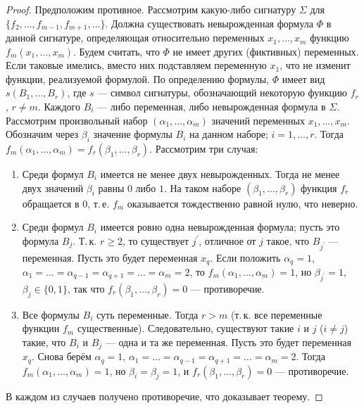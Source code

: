\begin{proof}
    Предположим противное. Рассмотрим какую-либо сигнатуру $\Sigma$ для $\{f_2, \ldots, f_{m - 1}, f_{m + 1}, \ldots\}$. Должна существовать невырожденная формула $\Phi$ в данной сигнатуре, определяющая относительно переменных $x_1, \ldots, x_m$ функцию $f_m(x_1, \ldots, x_m)$. Будем считать, что $\Phi$ не имеет других (фиктивных) переменных. Если таковые имелись, вместо них подставляем переменную $x_1$, что не изменит функции, реализуемой формулой. По определению формулы, $\Phi$ имеет вид $s(B_1, \ldots, B_r)$, где $s$ --- символ сигнатуры, обозначающий некоторую функцию $f_r$, $r \ne m$. Каждого $B_i$ --- либо переменная, либо невырожденная формула в $\Sigma$. Рассмотрим произвольный набор $(\alpha_1, \ldots, \alpha_m)$ значений переменных $x_1, \ldots, x_m$. Обозначим через $\beta_i$ значение формулы $B_i$ на данном наборе; $i = 1, \ldots, r$. Тогда $f_m(\alpha_1, \ldots, \alpha_m) = f_r(\beta_1, \ldots, \beta_r)$. Рассмотрим три случая:
    \begin{enumerate}
        \item Среди формул $B_i$ имеется не менее двух невырожденных. Тогда не менее двух значений $\beta_i$ равны $0$ либо $1$. На таком наборе $(\beta_1, \ldots, \beta_r)$ функция $f_r$ обращается в $0$, т.\,е. $f_m$ оказывается тождественно равной нулю, что неверно.
        \item Среди формул $B_i$ имеется ровно одна невырожденная формула; пусть это формула $B_j$. Т.\,к. $r \geqslant 2$, то существует $j^\prime$, отличное от $j$ такое, что $B_{j^\prime}$ --- переменная. Пусть это будет переменная $x_q$. Если положить $\alpha_q = 1$, $\alpha_1 = \ldots = \alpha_{q - 1} = \alpha_{q + 1} = \ldots = \alpha_m = 2$, то $f_m(\alpha_1, \ldots, \alpha_m) = 1$, но $\beta_{j^\prime} = 1$, $\beta_j \in \{0, 1\}$, так что $f_r(\beta_1, \ldots, \beta_r) = 0$ --- противоречие.
        \item Все формулы $B_i$ суть переменные. Тогда $r > m$ (т.\,к. все переменные функции $f_m$ существенные). Следовательно, существуют такие $i$ и $j$ ($i \ne j$) такие, что $B_i$ и $B_j$ --- одна и та же переменная. Пусть это будет переменная $x_q$. Снова берём $\alpha_q = 1$, $\alpha_1 = \ldots = \alpha_{q - 1} = \alpha_{q + 1} = \ldots = \alpha_m = 2$. Тогда $f_m(\alpha_1, \ldots, \alpha_m) = 1$, но $\beta_i = \beta_j = 1$, и $f_r(\beta_1, \ldots, \beta_r) = 0$ --- противоречие.
    \end{enumerate}

    В каждом из случаев получено противоречие, что доказывает теорему.
\end{proof}

